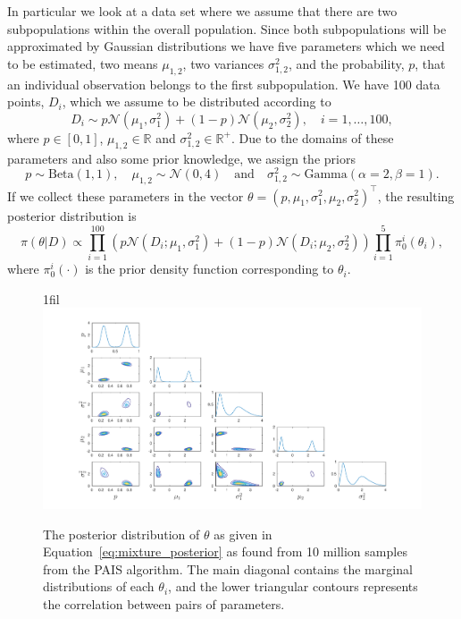 \documentclass[final]{siamltex}
\makeatletter
\newcommand*{\centerfloat}{%
  \parindent \z@
  \leftskip \z@ \@plus 1fil \@minus \textwidth
  \rightskip\leftskip
  \parfillskip \z@skip}
\makeatother
\begin{document}
In particular we look at a data set where we assume that there are two
subpopulations within the overall population. Since both
subpopulations will be approximated by Gaussian distributions we have
five parameters which we need to be estimated, two means $\mu_{1,2}$,
two variances $\sigma^2_{1,2}$, and the probability, $p$, that an
individual observation belongs to the first subpopulation. We have 100
data points, $D_i$, which we assume to be distributed according to
\[
	D_i \sim p\mathcal{N}(\mu_1, \sigma^2_1) + (1-p)\mathcal{N}
	(\mu_2, \sigma^2_2), \quad i = 1,\dots,100,
\]
where $p \in [0, 1]$, $\mu_{1,2} \in \mathbb{R}$ and $\sigma^2_{1,2}
\in \mathbb{R}^+$. Due to the domains of these parameters and also
some prior knowledge, we assign the priors
\[
	p \sim \text{Beta}(1,1), \quad \mu_{1,2} \sim \mathcal{N}(0, 4)
	 \quad \text{and} \quad \sigma^2_{1,2} \sim \text{Gamma}
	(\alpha=2, \beta=1).
\]
If we collect these parameters in the vector $\theta = (p, \mu_1,
\sigma^2_1, \mu_2, \sigma^2_2)^\top$, the resulting posterior
distribution is
\begin{equation}\label{eq:mixture_posterior}
	\pi(\theta|D) \propto \prod\limits_{i=1}^{100} (p\mathcal{N}
	(D_i;\mu_1, \sigma^2_1) + (1-p)\mathcal{N}(D_i;\mu_2, \sigma^2_2))
	\prod\limits_{i=1}^5 \pi_0^i(\theta_i),
\end{equation}
where $\pi_0^i(\cdot)$ is the prior density function corresponding to $\theta_i$.

\begin{figure}[htb]
\centerfloat
\includegraphics[width=1.2\textwidth]{"figures/PAIS_best_posterior"}
\caption{The posterior distribution of $\theta$ as given in
Equation~\eqref{eq:mixture_posterior} as found from 10 million samples
from the PAIS algorithm. The main diagonal contains the marginal
distributions of each $\theta_i$, and the lower triangular contours
represents the correlation between pairs of parameters.}
\label{fig:mixture_posterior}
\end{figure}
\end{document}
